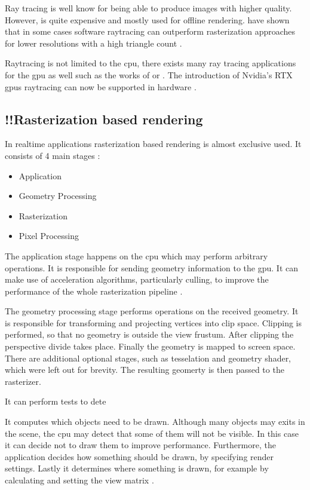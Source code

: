 Ray tracing is well know for being able to produce images with higher quality. However, is quite expensive and mostly used for offline rendering. \textcite{wald:2001:interactive} have shown that in some cases software raytracing can  outperform rasterization approaches for lower resolutions with a high triangle count \cite{wald:2001:interactive}.

Raytracing is not limited to the \gls{cpu}, there exists many ray tracing applications for the \gls{gpu} as well such as the works of \textcite{foley:2005:kd} or \textcite{parker:2010:optix}. The introduction of Nvidia's RTX \glspl{gpu} raytracing can now be supported in hardware \cite{raytracinggems}.


\subsection{!!Rasterization based rendering}




In realtime applications rasterization based rendering is almost exclusive used. It consists of 4 main stages \cite{akine:2018:realtime}:

\begin{itemize}
	\item Application
	\item Geometry Processing
	\item Rasterization
	\item Pixel Processing
\end{itemize}

The application stage happens on the \gls{cpu} which may perform arbitrary operations. It is responsible for sending geometry information to the \gls{gpu}. It can make use of acceleration algorithms, particularly culling, to improve the performance of the whole rasterization pipeline \cite{akine:2018:realtime}.

The geometry processing stage performs operations on the received geometry. It is responsible for transforming and projecting vertices into clip space. Clipping is performed, so that no geometry is outside the view frustum. After clipping the perspective divide takes place. Finally the geometry is mapped to screen space. There are additional optional stages, such as tesselation and geometry shader, which were left out for brevity. The resulting geomerty is then passed to the rasterizer.

It can perform tests to dete


 It computes which objects need to be drawn. Although many objects may exits in the scene, the \gls{cpu} may detect that some of them will not be visible. In this case it can decide not to draw them to improve performance. Furthermore, the application decides how something should be drawn, by specifying render settings. Lastly it determines where something is drawn, for example by calculating and setting the view matrix \cite{akine:2018:realtime}.

